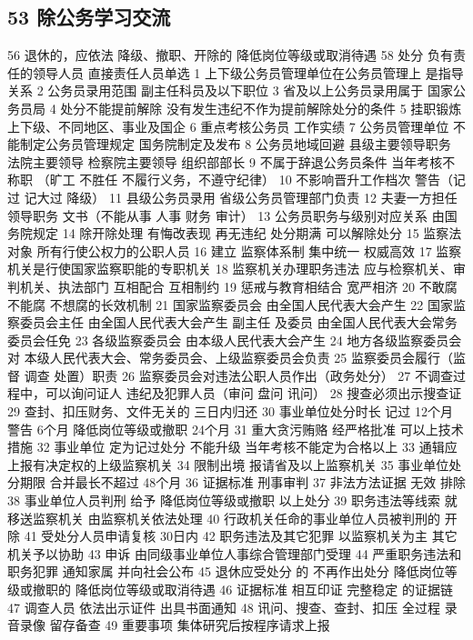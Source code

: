 \documentclass[cyan]{elegantnote}
\begin{document}
\subsection{53 除公务学习交流}
\label{sec:orgebcdb86}
56 退休的，应依法
降级、撤职、开除的 降低岗位等级或取消待遇
58 处分
负有责任的领导人员
直接责任人员单选
1 上下级公务员管理单位在公务员管理上
是指导关系
2 公务员录用范围
副主任科员及以下职位
3 省及以上公务员录用属于
国家公务员局
4 处分不能提前解除
没有发生违纪不作为提前解除处分的条件
5 挂职锻炼
上下级、不同地区、事业及国企
6 重点考核公务员
工作实绩
7 公务员管理单位
不能制定公务员管理规定
国务院制定及发布
8 公务员地域回避
县级主要领导职务
法院主要领导
检察院主要领导
组织部部长
9 不属于辞退公务员条件
当年考核不称职
（旷工 不胜任 不履行义务，不遵守纪律）
10 不影响晋升工作档次
警告（记过 记大过 降级）
11 县级公务员录用
省级公务员管理部门负责
12 夫妻一方担任领导职务
文书（不能从事 人事 财务 审计）
13 公务员职务与级别对应关系
由国务院规定
14 除开除处理
有悔改表现 再无违纪 处分期满 可以解除处分
15 监察法对象
所有行使公权力的公职人员
16 建立 监察体系制
集中统一 权威高效
17 监察机关是行使国家监察职能的专职机关
18 监察机关办理职务违法 应与检察机关、审判机关、执法部门
互相配合 互相制约
19 惩戒与教育相结合 宽严相济
20 不敢腐 不能腐 不想腐的长效机制
21 国家监察委员会
由全国人民代表大会产生
22 国家监察委员会主任 由全国人民代表大会产生 副主任 及委员
由全国人民代表大会常务委员会任免
23 各级监察委员会
由本级人民代表大会产生
24 地方各级监察委员会对
本级人民代表大会、常务委员会、上级监察委员会负责
25 监察委员会履行（监督 调查 处置）职责
26 监察委员会对违法公职人员作出（政务处分）
27 不调查过程中，可以询问证人
违纪及犯罪人员（审问 盘问 讯问）
28 搜查必须出示搜查证
29 查封、扣压财务、文件无关的
三日内归还
30 事业单位处分时长
记过 12个月
警告 6个月
降低岗位等级或撤职 24个月
31 重大贪污贿赂 经严格批准 可以上技术措施
32 事业单位 定为记过处分 不能升级 当年考核不能定为合格以上
33 通辑应上报有决定权的上级监察机关
34 限制出境
报请省及以上监察机关
35 事业单位处分期限 合并最长不超过
48个月
36 证据标准
刑事审判
37 非法方法证据
无效 排除
38 事业单位人员判刑
给予 降低岗位等级或撤职 以上处分
39 职务违法等线索
就移送监察机关 由监察机关依法处理
40 行政机关任命的事业单位人员被判刑的
开除
41 受处分人员申请复核
   30日内
42 职务违法及其它犯罪
以监察机关为主 其它机关予以协助
43 申诉
由同级事业单位人事综合管理部门受理
44 严重职务违法和职务犯罪
通知家属 并向社会公布
45 退休应受处分 的
不再作出处分 降低岗位等级或撤职的 降低岗位等级或取消待遇
46 证据标准
相互印证 完整稳定 的证据链
47 调查人员
依法出示证件 出具书面通知
48 讯问、搜查、查封、扣压
全过程 录音录像 留存备查
49 重要事项
集体研究后按程序请求上报
\end{document}
